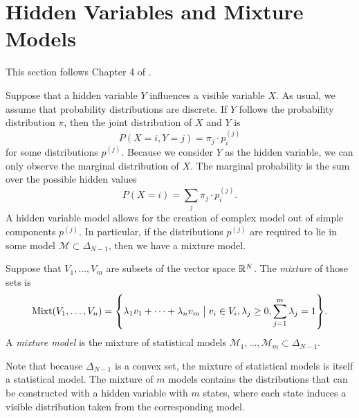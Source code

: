 \documentclass[cclicense]{hmcthesis}
\newcommand*{\Mod}{\mathcal{M}}
\DeclareMathOperator{\Mixt}{Mixt}
\numberwithin{equation}{section}
\begin{document}
\section{Hidden Variables and Mixture Models}
    This section follows Chapter 4 of \citep{DSS08}.

    Suppose that a hidden variable $Y$ influences a visible variable $X$.  As
    usual, we assume that probability distributions are discrete.  If $Y$
    follows the probability distribution $\pi$, then the joint distribution of
    $X$ and $Y$ is 
    \[
        P(X = i, Y = j) = \pi_j \cdot p_i^{(j)}
    \]
    for some distributions $p^{(j)}$.  Because we consider $Y$ as the hidden
    variable, we can only observe the marginal distribution of $X$.  The
    marginal probability is the sum over the possible hidden values
    \[
        P(X = i) = \sum_{j} \pi_j \cdot p_i^{(j)}.
    \]
    A hidden variable model allows for the creation of complex model out of
    simple components $p^{(j)}$.  In particular, if the distributions $p^{(j)}$
    are required to lie in some model $\Mod \subset \Delta_{N-1}$, then we have
    a mixture model.
    \begin{definition}
    Suppose that $V_1, \ldots, V_m$ are subsets of the vector space $\mathbb{R}^N$.  The
    \emph{mixture} of those sets is 
    \[
        \Mixt(V_1, \ldots, V_n) = \cdel*{
            \lambda_1 v_1 + \cdots + \lambda_n v_m
            \;\big\vert\;
            v_i \in V_i, \lambda_j \ge 0, \sum_{j=1}^m \lambda_j = 1
        }.
    \]
    A \emph{mixture model} is the mixture of statistical models $\Mod_1, \ldots,
    \Mod_m \subset \Delta_{N-1}$.  
    \end{definition}
    Note that because $\Delta_{N-1}$ is a convex set, the mixture of statistical
    models is itself a statistical model.  The mixture of $m$ models contains
    the distributions that can be constructed with a hidden variable with $m$
    states, where each state induces a visible distribution taken from the
    corresponding model.
\end{document}
